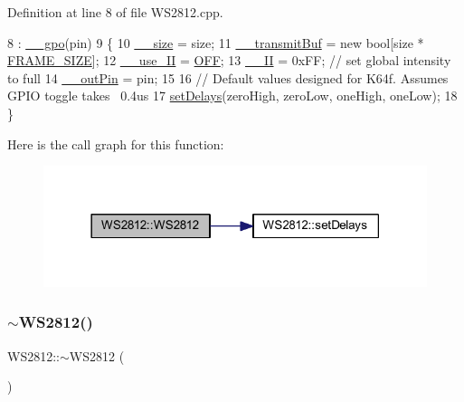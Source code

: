 Definition at line 8 of file W\+S2812.\+cpp.


\begin{DoxyCode}
8                                                                                         : 
      \hyperlink{class_w_s2812_a37c5f3871012186c92a1bf856ca888ee}{\_\_gpo}(pin)
9 \{
10     \hyperlink{class_w_s2812_a5623ee0fd628d54483c0427f30f4d568}{\_\_size} = size;
11     \hyperlink{class_w_s2812_a345b0895fb037ed603a79806bb7e510c}{\_\_transmitBuf} = \textcolor{keyword}{new} \textcolor{keywordtype}{bool}[size * \hyperlink{_w_s2812_8h_af9b1b2ba12857a4bf11289dac8c5462d}{FRAME\_SIZE}];
12     \hyperlink{class_w_s2812_a249d1039add9ef099574fc4a52aa1235}{\_\_use\_II} = \hyperlink{class_w_s2812_a14186f70863bf4f3a35b2cc21b15642da3937d959838b5887619b403a2f717d55}{OFF};
13     \hyperlink{class_w_s2812_a90cb6ef1c50bfa6b2d1a7e6100adead7}{\_\_II} = 0xFF; \textcolor{comment}{// set global intensity to full}
14     \hyperlink{class_w_s2812_a8e08f8b78b58930cef508a4a66a27916}{\_\_outPin} = pin;
15 
16     \textcolor{comment}{// Default values designed for K64f. Assumes GPIO toggle takes ~0.4us}
17     \hyperlink{class_w_s2812_a7e1370e6fbb56daa68f1146e7b58d9ec}{setDelays}(zeroHigh, zeroLow, oneHigh, oneLow);
18 \}
\end{DoxyCode}
Here is the call graph for this function\+:\nopagebreak
\begin{figure}[H]
\begin{center}
\leavevmode
\includegraphics[width=318pt]{class_w_s2812_a397fb1e75594024884cb4365d3c725cd_cgraph}
\end{center}
\end{figure}
\mbox{\label{class_w_s2812_a58973dedd9cbc5c3fd3397f07f9a720f}} 
\subsubsection{\texorpdfstring{$\sim$\+W\+S2812()}{~WS2812()}}
{\footnotesize\ttfamily W\+S2812\+::$\sim$\+W\+S2812 (\begin{DoxyParamCaption}{ }\end{DoxyParamCaption})}

